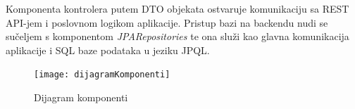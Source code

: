 			
			Komponenta kontrolera putem DTO objekata ostvaruje komunikaciju sa REST API-jem i poslovnom logikom aplikacije.
			Pristup bazi na backendu nudi se sučeljem s komponentom \textit{JPARepositories} 
			te ona služi kao glavna komunikacija aplikacije i SQL baze podataka u jeziku JPQL.
			
			 \begin{figure}[h]
			 	\texttt{[image: dijagramKomponenti]}
			 	\caption{Dijagram komponenti}
			 \end{figure} 
			